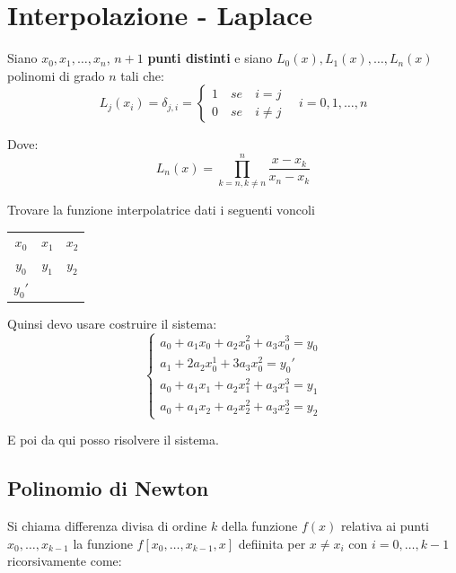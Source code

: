\chapter{Interpolazione - Laplace}

Siano $x_0, x_1, \dots, x_n$, $n + 1$ \textbf{punti distinti} e siano $L_0(x), L_1(x), \dots, L_n(x)$ polinomi di grado $n$ tali che:
\begin{equation}
 L_j(x_i) = \delta_{j, i} = 
   \begin{cases}
      1 \quad se \quad i = j \\ 
      0 \quad se \quad i \neq j
   \end{cases}
   \quad 
   i = 0,1, \dots, n
\end{equation}

Dove:
\begin{equation}
  L_n(x) = \prod_{k=n,k\neq n}^{n} \displaystyle\frac{x - x_k}{x_n - x_k}
\end{equation}



Trovare la funzione interpolatrice dati i seguenti voncoli
\begin{center}
  \begin{tabular}{ c c c }
    $x_0$ & $x_1$ & $x_2$ \\
    $y_0$ & $y_1$ & $y_2$ \\
    $y_0'$
  \end{tabular}
\end{center}

Quinsi devo usare costruire il sistema:
\begin{equation}
  \begin{cases}
    a_0 + a_1x_0 + a_2x_0^2 + a_3x_0^3 = y_0 \\
    a_1 + 2a_2x_0^1 + 3a_3x_0^2 = y_0' \\
    a_0 + a_1x_1 + a_2x_1^2 + a_3x_1^3 = y_1 \\
    a_0 + a_1x_2 + a_2x_2^2 + a_3x_2^3 = y_2
  \end{cases}
\end{equation}

E poi da qui posso risolvere il sistema.

\section{Polinomio di Newton}

Si chiama differenza divisa di ordine $k$ della funzione $f(x)$ relativa ai punti $x_0, \dots, x_{k-1}$
la funzione $f[x_0, \dots, x_{k-1}, x]$ defiinita per $x \neq x_i$ con $i = 0, \dots, k-1$ ricorsivamente come:

